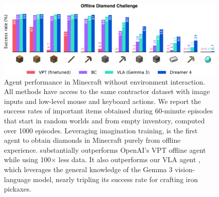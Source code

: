\begin{figure}[t!]
\centering
\vspace*{-3ex}
\includegraphics[width=\linewidth]{figures/rl/rl}
\caption{
Agent performance in Minecraft without environment interaction.
All methods have access to the same contractor dataset\citep{vpt} with image inputs and low-level mouse and keyboard actions.
We report the success rates of important items obtained during 60-minute episodes that start in random worlds and from empty inventory, computed over 1000 episodes.
Leveraging imagination training, \method is the first agent to obtain diamonds in Minecraft purely from offline experience.
\method substantially outperforms OpenAI's VPT offline agent\citep{vpt} while using 100$\times$ less data.
It also outperforms our VLA agent \citep{kim2024openvla,intelligence2025pi05}, which leverages the general knowledge of the Gemma 3 vision-language model\citep{team2025gemma3}, nearly tripling its success rate for crafting iron pickaxes.
}
\label{fig:rl}
\end{figure}
